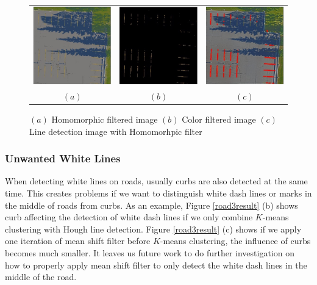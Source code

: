 \documentclass{m2pi}
\begin{document}
\begin{figure}[htp]
\centering
\begin{tabular}{ccc}
\includegraphics[width = 3.8cm]{figures/Transformed_Homomorphic_Lot11.jpg}&
\includegraphics[width = 3.8cm]{figures/Masked_Homomorphic_Lot11.jpg}&
\includegraphics[width= 3.8cm]{figures/line_detected_Homomorphic_Lot11.jpg}\\
$(a)$ & $(b)$ & $(c)$
\end{tabular}
\caption{$(a)$ Homomorphic filtered image $(b)$ Color filtered image $(c)$ Line detection image with Homomorhpic filter}
\label{homo_transformed}
\end{figure}

\subsubsection{Unwanted White Lines}

When detecting white lines on roads, usually curbs are also detected at the same time. This creates problems if we want to distinguish white dash lines or marks in the middle of roads from curbs. As an example, Figure \ref{road3result} (b) shows curb affecting the detection of white dash lines if we only combine $K$-means clustering with Hough line detection.  Figure \ref{road3result} (c) shows if we apply one iteration of mean shift filter before $K$-means clustering, the influence of curbs becomes much smaller. 
It leaves us future work to do further investigation on how to properly apply 
mean shift filter to only detect the white dash lines in the middle of the road.
\end{document}
